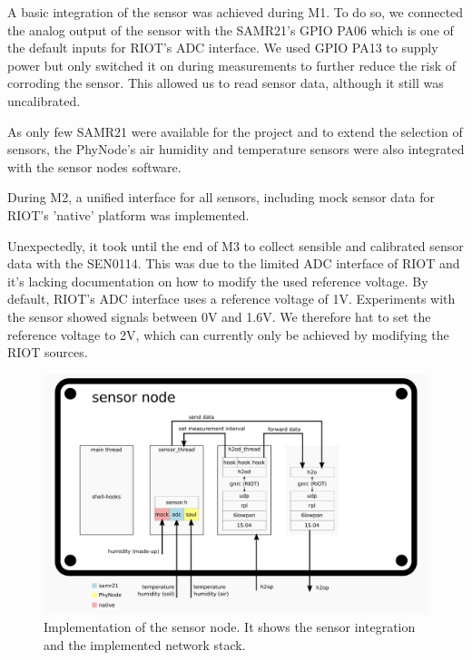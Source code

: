 \documentclass[11pt,paper=a4,parskip=half]{scrartcl}
\begin{document}
  A basic integration of the sensor was achieved during M1. To do so, we
  connected the analog output of the sensor with the SAMR21's GPIO PA06 which
  is one of the default inputs for RIOT's ADC interface. We used GPIO PA13 to
  supply power but only switched it on during measurements to further reduce
  the risk of corroding the sensor. This allowed us to read sensor data,
  although it still was uncalibrated.

  As only few SAMR21 were available for the project and to extend the selection
  of sensors, the PhyNode's air humidity and temperature sensors were also
  integrated with the sensor nodes software.

  During M2, a unified interface for all sensors, including mock sensor data
  for RIOT's 'native' platform was implemented.

  Unexpectedly, it took until the end of M3 to collect sensible and calibrated
  sensor data with the SEN0114. This was due to the limited ADC interface of
  RIOT and it's lacking documentation on how to modify the used reference
  voltage. By default, RIOT's ADC interface uses a reference voltage of 1V.
  Experiments with the sensor showed signals between 0V and 1.6V. We therefore
  hat to set the reference voltage to 2V, which can currently only be achieved
  by modifying the RIOT sources.



  \begin{figure}[h]
    \centering
    \includegraphics[scale=0.16]{stack-sensor}
	  \caption{Implementation of the sensor node. It shows the sensor
	  integration and the implemented network stack.}
    \label{fig:stack_sensor}
  \end{figure}
\end{document}
